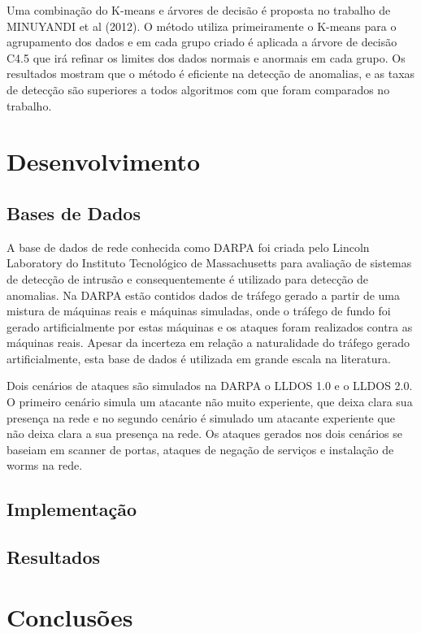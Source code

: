 \documentclass[12pt,openright,oneside,a4paper,english,spanish,brazil]{unifil}
\begin{document}
\indent Uma combinação do K-means e árvores de decisão é proposta no trabalho de MINUYANDI et al (2012). O método utiliza primeiramente o K-means para o agrupamento dos dados e em cada grupo criado é aplicada a árvore de decisão C4.5 que irá refinar os limites dos dados normais e anormais em cada grupo. Os resultados mostram que o método é eficiente na detecção de anomalias, e as taxas de detecção são superiores a todos algoritmos com que foram comparados no trabalho.

\chapter{Desenvolvimento}

  \section{Bases de Dados}
\indent A base de dados de rede conhecida como DARPA foi criada pelo Lincoln Laboratory do Instituto Tecnológico de Massachusetts para avaliação de sistemas de detecção de intrusão e consequentemente é utilizado para detecção de anomalias. Na DARPA estão contidos dados de tráfego gerado a partir de uma mistura de máquinas reais e máquinas simuladas, onde o tráfego de fundo foi gerado artificialmente por estas máquinas e os ataques foram realizados contra as máquinas reais. Apesar da incerteza em relação a naturalidade do tráfego gerado artificialmente, esta base de dados é utilizada em grande escala na literatura.

\indent Dois cenários de ataques são simulados na DARPA o LLDOS 1.0 e o LLDOS 2.0. O primeiro cenário simula um atacante não muito experiente, que deixa clara sua presença na rede e no segundo cenário é simulado um atacante experiente que não deixa clara a sua presença na rede. Os ataques gerados nos dois cenários se baseiam em scanner de portas, ataques de negação de serviços e instalação de worms na rede.



  \section{Implementação}
  
  \section{Resultados}
  
\chapter{Conclusões}
\end{document}
